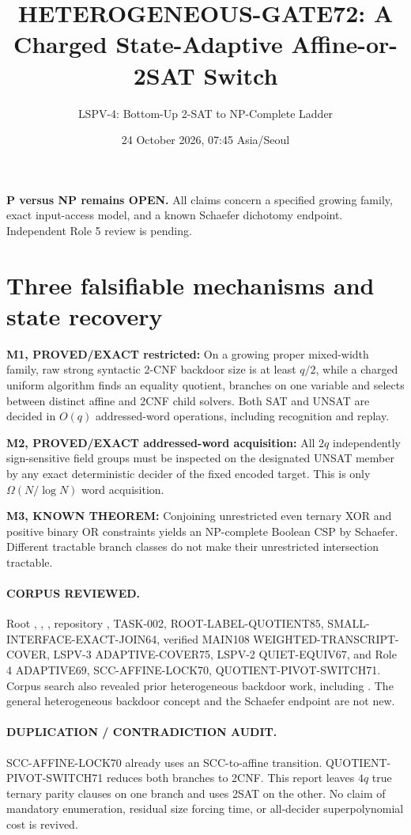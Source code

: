 \documentclass[11pt]{article}
\title{HETEROGENEOUS-GATE72: A Charged State-Adaptive Affine-or-2SAT Switch}
\author{LSPV-4: Bottom-Up 2-SAT to NP-Complete Ladder}
\date{24 October 2026, 07:45 Asia/Seoul}
\begin{document}
\maketitle
\begin{center}\textbf{P versus NP remains OPEN.}
All claims concern a specified growing family, exact input-access model,
and a known Schaefer dichotomy endpoint. Independent Role 5 review is pending.
\end{center}

\section{Three falsifiable mechanisms and state recovery}
\noindent\textbf{M1, PROVED/EXACT restricted:} On a growing proper mixed-width family, raw strong syntactic 2-CNF backdoor size is at least $q/2$, while a charged uniform algorithm finds an equality quotient, branches on one variable and selects between distinct affine and 2CNF child solvers. Both SAT and UNSAT are decided in $O(q)$ addressed-word operations, including recognition and replay.
\par\noindent\textbf{M2, PROVED/EXACT addressed-word acquisition:} All $2q$ independently sign-sensitive field groups must be inspected on the designated UNSAT member by any exact deterministic decider of the fixed encoded target. This is only $\Omega(N/\log N)$ word acquisition.
\par\noindent\textbf{M3, KNOWN THEOREM:} Conjoining unrestricted even ternary XOR and positive binary OR constraints yields an NP-complete Boolean CSP by Schaefer. Different tractable branch classes do not make their unrestricted intersection tractable.

\paragraph{CORPUS REVIEWED.} Root , ,
, repository ,
TASK-002, ROOT-LABEL-QUOTIENT85, SMALL-INTERFACE-EXACT-JOIN64,
verified MAIN108 WEIGHTED-TRANSCRIPT-COVER, LSPV-3 ADAPTIVE-COVER75,
LSPV-2 QUIET-EQUIV67, and Role 4 ADAPTIVE69, SCC-AFFINE-LOCK70,
QUOTIENT-PIVOT-SWITCH71. Corpus search also revealed prior heterogeneous
backdoor work, including . The general heterogeneous
backdoor concept and the Schaefer endpoint are not new.
\paragraph{DUPLICATION / CONTRADICTION AUDIT.}
SCC-AFFINE-LOCK70 already uses an SCC-to-affine transition.
QUOTIENT-PIVOT-SWITCH71 reduces both branches to 2CNF.
This report leaves $4q$ true ternary parity clauses on one branch and
uses 2SAT on the other. No claim of mandatory enumeration, residual
size forcing time, or all-decider superpolynomial cost is revived.
\end{document}
